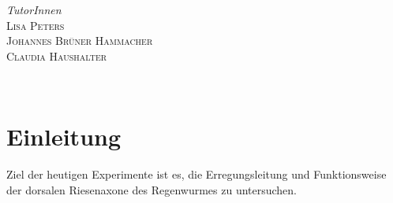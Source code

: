 \documentclass[11pt]{article}
\begin{document}
\begin{titlepage}
\begin{minipage}{0.45\textwidth}
\begin{flushright}
		\end{flushright}
	\end{minipage}
\vfill
	\begin{minipage}{0.7\textwidth}
		\begin{flushleft}
			\large
			\textit{TutorInnen}\\
			\textsc{Lisa Peters}\\
			\textsc{Johannes Brüner Hammacher}\\
			\textsc{Claudia Haushalter}
		\end{flushleft}
	\end{minipage}
	~
		\begin{minipage}{0.2\textwidth}
		\begin{flushright}
			
		\end{flushright}
	\end{minipage}

	\vfill\vfill\vfill %

	
	\vfill %
	
\end{titlepage}

\section{Einleitung}
Ziel der heutigen Experimente ist es, die Erregungsleitung und Funktionsweise der dorsalen Riesenaxone des Regenwurmes zu untersuchen. 
\end{document}
